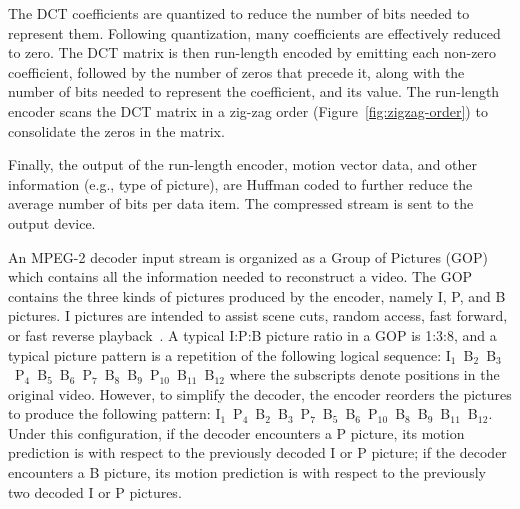 
The DCT coefficients are quantized to reduce the number of bits needed
to represent them. Following quantization, many coefficients are
effectively reduced to zero. The DCT matrix is then run-length encoded
by emitting each non-zero coefficient,
followed by the number of zeros that precede it, along with the number
of bits needed to represent the coefficient, and its value. The
run-length encoder scans the DCT matrix in a zig-zag order
(Figure~\ref{fig:zigzag-order}) to consolidate the zeros in the matrix.

Finally, the output of the run-length encoder, motion vector data,
and other information (e.g., type of picture), are Huffman coded to
further reduce the average number of bits per data item. The compressed
stream is sent to the output device.


An MPEG-2 decoder input stream is organized as a Group of Pictures
(GOP) which contains all the information needed to reconstruct a
video. The GOP contains the three kinds of pictures produced by the
encoder, namely I, P, and B pictures. I pictures are intended to
assist scene cuts, random access, fast forward, or fast reverse
playback~\cite[p. 14]{MPEG2}. A typical I:P:B picture ratio in a GOP
is 1:3:8, and a typical picture pattern is a repetition of the
following logical sequence:
I$_1$~B$_2$~B$_3$~P$_4$~B$_5$~B$_6$~P$_7$~B$_8$~B$_9$~P$_{10}$~B$_{11}$~B$_{12}$
where the subscripts denote positions in the original video.  However,
to simplify the decoder, the encoder reorders the pictures to produce
the following pattern:
I$_1$~P$_4$~B$_2$~B$_3$~P$_7$~B$_5$~B$_6$~P$_{10}$~B$_8$~B$_9$~B$_{11}$~B$_{12}$.
Under this configuration, if the decoder encounters a P picture, its
motion prediction is with respect to the previously decoded I or P
picture; if the decoder encounters a B picture, its motion prediction
is with respect to the previously two decoded I or P pictures.

